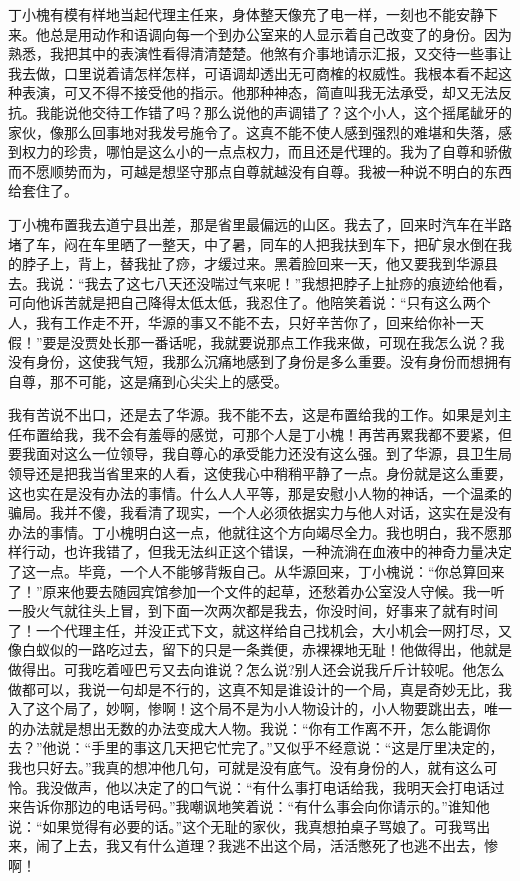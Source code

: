 \documentclass[12pt,oneside]{book}
\begin{document}
丁小槐有模有样地当起代理主任来，身体整天像充了电一样，一刻也不能安静下来。他总是用动作和语调向每一个到办公室来的人显示着自己改变了的身份。因为熟悉，我把其中的表演性看得清清楚楚。他煞有介事地请示汇报，又交待一些事让我去做，口里说着请怎样怎样，可语调却透出无可商榷的权威性。我根本看不起这种表演，可又不得不接受他的指示。他那种神态，简直叫我无法承受，却又无法反抗。我能说他交待工作错了吗？那么说他的声调错了？这个小人，这个摇尾龇牙的家伙，像那么回事地对我发号施令了。这真不能不使人感到强烈的难堪和失落，感到权力的珍贵，哪怕是这么小的一点点权力，而且还是代理的。我为了自尊和骄傲而不愿顺势而为，可越是想坚守那点自尊就越没有自尊。我被一种说不明白的东西给套住了。

丁小槐布置我去道宁县出差，那是省里最偏远的山区。我去了，回来时汽车在半路堵了车，闷在车里晒了一整天，中了暑，同车的人把我扶到车下，把矿泉水倒在我的脖子上，背上，替我扯了痧，才缓过来。黑着脸回来一天，他又要我到华源县去。我说：``我去了这七八天还没喘过气来呢！''我想把脖子上扯痧的痕迹给他看，可向他诉苦就是把自己降得太低太低，我忍住了。他陪笑着说：``只有这么两个人，我有工作走不开，华源的事又不能不去，只好辛苦你了，回来给你补一天假！''要是没贾处长那一番话呢，我就要说那点工作我来做，可现在我怎么说？我没有身份，这使我气短，我那么沉痛地感到了身份是多么重要。没有身份而想拥有自尊，那不可能，这是痛到心尖尖上的感受。

我有苦说不出口，还是去了华源。我不能不去，这是布置给我的工作。如果是刘主任布置给我，我不会有羞辱的感觉，可那个人是丁小槐！再苦再累我都不要紧，但要我面对这么一位领导，我自尊心的承受能力还没有这么强。到了华源，县卫生局领导还是把我当省里来的人看，这使我心中稍稍平静了一点。身份就是这么重要，这也实在是没有办法的事情。什么人人平等，那是安慰小人物的神话，一个温柔的骗局。我并不傻，我看清了现实，一个人必须依据实力与他人对话，这实在是没有办法的事情。丁小槐明白这一点，他就往这个方向竭尽全力。我也明白，我不愿那样行动，也许我错了，但我无法纠正这个错误，一种流淌在血液中的神奇力量决定了这一点。毕竟，一个人不能够背叛自己。从华源回来，丁小槐说：``你总算回来了！''原来他要去随园宾馆参加一个文件的起草，还愁着办公室没人守候。我一听一股火气就往头上冒，到下面一次两次都是我去，你没时间，好事来了就有时间了！一个代理主任，并没正式下文，就这样给自己找机会，大小机会一网打尽，又像白蚁似的一路吃过去，留下的只是一条粪便，赤裸裸地无耻！他做得出，他就是做得出。可我吃着哑巴亏又去向谁说？怎么说?别人还会说我斤斤计较呢。他怎么做都可以，我说一句却是不行的，这真不知是谁设计的一个局，真是奇妙无比，我入了这个局了，妙啊，惨啊！这个局不是为小人物设计的，小人物要跳出去，唯一的办法就是想出无数的办法变成大人物。我说：``你有工作离不开，怎么能调你去？''他说：``手里的事这几天把它忙完了。''又似乎不经意说：``这是厅里决定的，我也只好去。''我真的想冲他几句，可就是没有底气。没有身份的人，就有这么可怜。我没做声，他以决定了的口气说：``有什么事打电话给我，我明天会打电话过来告诉你那边的电话号码。''我嘲讽地笑着说：``有什么事会向你请示的。''谁知他说：``如果觉得有必要的话。''这个无耻的家伙，我真想拍桌子骂娘了。可我骂出来，闹了上去，我又有什么道理？我逃不出这个局，活活憋死了也逃不出去，惨啊！
\end{document}
